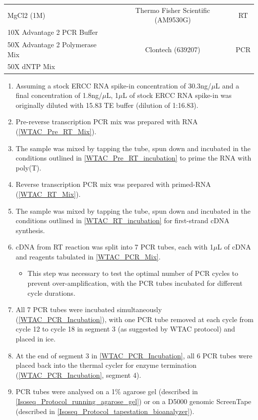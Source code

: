 \begin{table}[h]
\begin{tabularx}{0.95\textwidth}{lcc}
		MgCl2 (1M)                                                    & Thermo Fisher Scientific (AM9530G)                    & RT                   \\
		10X Advantage 2 PCR Buffer                                    & \multirow{3}{*}{Clontech (639207)}                    & \multirow{3}{*}{PCR} \\
		50X Advantage 2 Polymerase Mix                                &                                                       &                      \\
		50X dNTP Mix                                                  &                                                       &                      \\ \cmidrule(r){1-3}
	\end{tabularx}
\end{table}

\begin{enumerate}
	\item Assuming a stock ERCC RNA spike-in concentration of 30.3ng/$\mu$L and a final concentration of 1.8ng/$\mu$L, 1$\mu$L of stock ERCC RNA spike-in was originally diluted with 15.83 TE buffer (dilution of 1:16.83). 
	\item Pre-reverse transcription PCR mix was prepared with RNA (\cref{WTAC_Pre_RT_Mix}).
	\item The sample was mixed by tapping the tube, spun down and incubated in the conditions outlined in \cref{WTAC_Pre_RT_incubation} to prime the RNA with poly(T).
	\item Reverse transcription PCR mix was prepared with primed-RNA (\cref{WTAC_RT_Mix}).
	\item The sample was mixed by tapping the tube, spun down and incubated in the conditions outlined in \cref{WTAC_RT_incubation} for first-strand cDNA synthesis.
	\item cDNA from RT reaction was split into 7 PCR tubes, each with 1$\mu$L of cDNA and reagents tabulated in \cref{WTAC_PCR_Mix}.
		\begin{itemize}
			\item This step was necessary to test the optimal number of PCR cycles to prevent over-amplification, with the PCR tubes incubated for different cycle durations.
		\end{itemize}
	\item All 7 PCR tubes were incubated simultaneously (\cref{WTAC_PCR_Incubation}), with one PCR tube removed at each cycle from cycle 12 to cycle 18 in segment 3 (as suggested by WTAC protocol) and placed in ice.
	\item At the end of segment 3 in \cref{WTAC_PCR_Incubation}, all 6 PCR tubes were placed back into the thermal cycler for enzyme termination (\cref{WTAC_PCR_Incubation}, segment 4). 
	\item PCR tubes were analysed on a 1\% agarose gel (described in \cref{Isoseq_Protocol_running_agarose_gel}) or on a D5000 genomic ScreenTape (described in \cref{Isoseq_Protocol_tapestation_bioanalyzer}).	
\end{enumerate}

